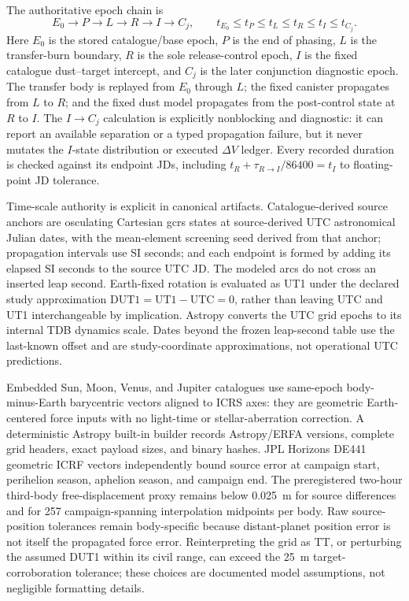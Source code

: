     The authoritative epoch chain is
    \begin{equation}
        E_0 \rightarrow P \rightarrow L \rightarrow R \rightarrow I \rightarrow C_j,
        \qquad
        t_{E_0}\le t_P\le t_L\le t_R\le t_I\le t_{C_j}.
        \label{eq:timeline_v2_epochs}
    \end{equation}
    Here \(E_0\) is the stored catalogue/base epoch, \(P\) is the end of phasing, \(L\) is the transfer-burn boundary, \(R\) is the sole release-control epoch, \(I\) is the fixed catalogue dust--target intercept, and \(C_j\) is the later conjunction diagnostic epoch. The transfer body is replayed from \(E_0\) through \(L\); the fixed canister propagates from \(L\) to \(R\); and the fixed dust model propagates from the post-control state at \(R\) to \(I\). The \(I\rightarrow C_j\) calculation is explicitly nonblocking and diagnostic: it can report an available separation or a typed propagation failure, but it never mutates the \(I\)-state distribution or executed \(\Delta V\) ledger. Every recorded duration is checked against its endpoint JDs, including \(t_R+\tau_{R\rightarrow I}/86400=t_I\) to floating-point JD tolerance.

    Time-scale authority is explicit in canonical artifacts. Catalogue-derived source anchors are osculating Cartesian \gls{gcrs} states at source-derived UTC astronomical Julian dates, with the mean-element screening seed derived from that anchor; propagation intervals use SI seconds; and each endpoint is formed by adding its elapsed SI seconds to the source UTC JD. The modeled arcs do not cross an inserted leap second. Earth-fixed rotation is evaluated as UT1 under the declared study approximation \(\mathrm{DUT1}=\mathrm{UT1}-\mathrm{UTC}=0\), rather than leaving UTC and UT1 interchangeable by implication. Astropy converts the UTC grid epochs to its internal TDB dynamics scale. Dates beyond the frozen leap-second table use the last-known offset and are study-coordinate approximations, not operational UTC predictions.

    Embedded Sun, Moon, Venus, and Jupiter catalogues use same-epoch body-minus-Earth barycentric vectors aligned to ICRS axes: they are geometric Earth-centered force inputs with no light-time or stellar-aberration correction. A deterministic Astropy built-in builder records Astropy/ERFA versions, complete grid headers, exact payload sizes, and binary hashes. JPL Horizons DE441 geometric ICRF vectors independently bound source error at campaign start, perihelion season, aphelion season, and campaign end. The preregistered two-hour third-body free-displacement proxy remains below \SI{0.025}{\metre} for source differences and for 257 campaign-spanning interpolation midpoints per body. Raw source-position tolerances remain body-specific because distant-planet position error is not itself the propagated force error. Reinterpreting the grid as TT, or perturbing the assumed DUT1 within its civil range, can exceed the \SI{25}{\metre} target-corroboration tolerance; these choices are documented model assumptions, not negligible formatting details.


